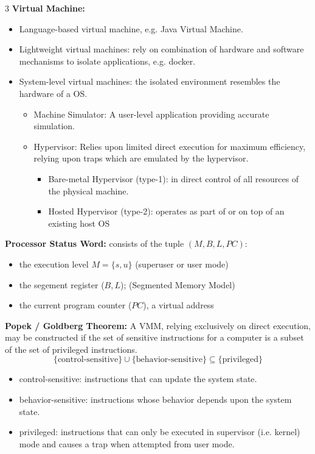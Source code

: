 \documentclass[8pt]{innovativeinnovation-cheatsheet}
\begin{document}
\begin{multicols*}{3}
\textbf{Virtual Machine:}
\begin{itemize}
      \item Language-based virtual machine, e.g. Java Virtual Machine.
      \item Lightweight virtual machines: rely on combination of hardware and software mechanisms to isolate applications, e.g. docker.
      \item System-level virtual machines: the isolated environment resembles the hardware of a OS.
      \begin{itemize}
            \item Machine Simulator: A user-level application providing accurate simulation.
            \item Hypervisor: Relies upon limited direct execution for maximum efficiency, relying upon traps which are emulated by the hypervisor.
            \begin{itemize}
                  \item Bare-metal Hypervisor (type-1): in direct control of all resources of the physical machine.
                  \item Hosted Hypervisor (type-2): operates as part of or on top of an existing host OS
            \end{itemize}
      \end{itemize}
\end{itemize}

\textbf{Processor Status Word:} consists of the tuple $(M, B, L, PC)$:
\begin{itemize}
      \item the execution level $M=\{s, u\}$ (superuser or user mode)
      \item the segement register ($B,L$); (Segmented Memory Model)
      \item the current program counter ($PC$), a virtual address
\end{itemize} 

\textbf{Popek / Goldberg Theorem: }
A VMM, relying exclusively on direct execution, may be constructed if the set of sensitive instructions for a computer is a subset of the set of privileged instructions.
\begin{equation*}
      \{ \text{control-sensitive} \} \cup\{ \text{behavior-sensitive} \} \subseteq\{ \text{privileged} \}
\end{equation*}
\begin{itemize}
      \item control-sensitive: instructions that can update the system state.
      \item behavior-sensitive: instructions whose behavior depends upon the system state.
      \item privileged: instructions that can only be executed in supervisor (i.e. kernel) mode and causes a trap when attempted from user mode.
\end{itemize}


\end{multicols*}
\end{document}

